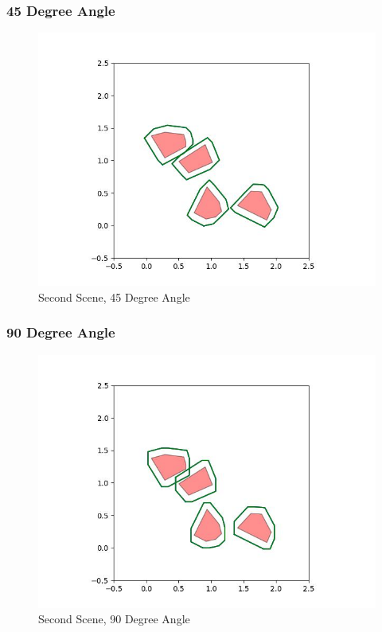 \documentclass{article}
\begin{document}
\newpage
\subsubsection{45 Degree Angle}
\begin{figure}[h!]
	\includegraphics[width= 0.9 \linewidth]{Problem3_minkowski2_45.jpg}
	\centering
	\caption{Second Scene, 45 Degree Angle}
	\label{Problem3_minkowski2_45.jpg}
\end{figure}

\newpage
\subsubsection{90 Degree Angle}
\begin{figure}[h!]
	\includegraphics[width= 0.9 \linewidth]{Problem3_minkowski2_90.jpg}
	\centering
	\caption{Second Scene, 90 Degree Angle}
	\label{Problem3_minkowski2_90.jpg}
\end{figure}
\end{document}
